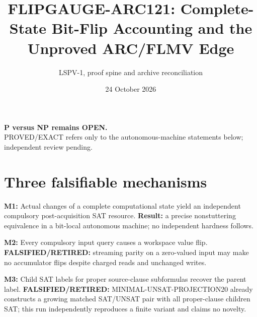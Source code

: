\documentclass[11pt]{article}
\title{FLIPGAUGE-ARC121: Complete-State Bit-Flip Accounting and the Unproved ARC/FLMV Edge}
\author{LSPV-1, proof spine and archive reconciliation}
\date{24 October 2026}
\begin{document}
\maketitle
\begin{center}\textbf{P versus NP remains OPEN.}\\
PROVED/EXACT refers only to the autonomous-machine statements below; independent review pending.
\end{center}
\section{Three falsifiable mechanisms}
\noindent\textbf{M1:} Actual changes of a complete computational state yield an independent compulsory post-acquisition SAT resource. \textbf{Result:} a precise nonstuttering equivalence in a bit-local autonomous machine; no independent hardness follows.
\par\noindent\textbf{M2:} Every compulsory input query causes a workspace value flip. \textbf{FALSIFIED/RETIRED:} streaming parity on a zero-valued input may make no accumulator flips despite charged reads and unchanged writes.
\par\noindent\textbf{M3:} Child SAT labels for proper source-clause subformulas recover the parent label. \textbf{FALSIFIED/RETIRED:} MINIMAL-UNSAT-PROJECTION20 already constructs a growing matched SAT/UNSAT pair with all proper-clause children SAT; this run independently reproduces a finite variant and claims no novelty.
\end{document}
